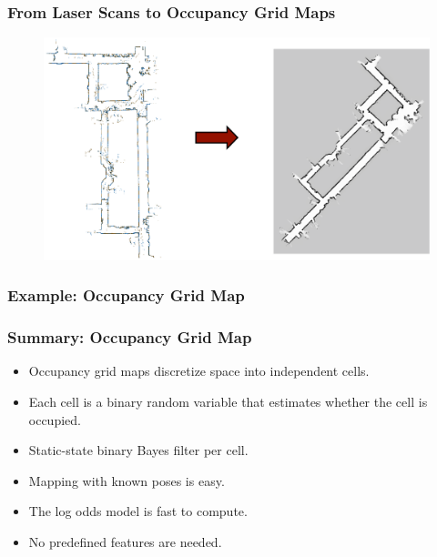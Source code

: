     \begin{frame}
    \frametitle{From Laser Scans to Occupancy Grid Maps}
    
    \begin{figure}[!h]
    \includegraphics[width=0.6\columnwidth]{./images/laser_scans_to_maps.pdf}
    \end{figure}
    
    \end{frame}
    
\begin{frame}
    \frametitle{Example: Occupancy Grid Map}
    

    \begin{center}
    \end{center}
        
\end{frame}
\begin{frame}
    \frametitle{Summary: Occupancy Grid Map}
    \begin{itemize}
    \item Occupancy grid maps discretize space into independent cells.
    \item Each cell is a binary random variable that estimates whether the cell is occupied.
    \item Static-state binary Bayes filter per cell.
    \item Mapping with known poses is easy.
    \item The log odds model is fast to compute.
    \item No predefined features are needed.
    \end{itemize}
    
    \end{frame}
    
